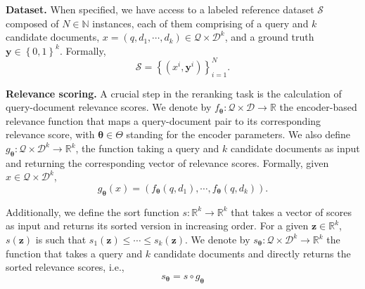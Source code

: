 \noindent \textbf{Dataset.} When specified, we have access to a labeled reference dataset $\mathcal{S}$ composed of $N \in \mathbb{N}$ instances, each of them comprising of a query and $k$ candidate documents, $x = \left( q, d_1, \cdots, d_k \right) \in  \mathcal{Q} \times \mathcal{D}^k$, and a ground truth $\mathbf{y} \in \left\{0,1\right\}^k$. Formally, 
\begin{equation}\label{eq:dataset}
\mathcal{S} = \left \{ \left( x^i, \mathbf{y}^i \right) \right \}_{i=1}^N.
\end{equation}

\noindent \textbf{Relevance scoring.} A crucial step in the reranking task is the calculation of query-document relevance scores. We denote by $f_{\bm{\theta}} : \mathcal{Q} \times \mathcal{D} \rightarrow \mathbb{R}$ the encoder-based relevance function that maps a query-document pair to its corresponding relevance score, with $\bm{\theta} \in \Theta$ standing for the encoder parameters. We also define $g_{\bm{\theta}} : \mathcal{Q} \times \mathcal{D}^k \rightarrow \mathbb{R}^k$, the function taking a query and $k$ candidate documents as input and returning the corresponding vector of relevance scores. Formally, given $x \in  \mathcal{Q} \times \mathcal{D}^k$, 
%
\begin{equation}\label{eq:rel_scores}
g_{\bm{\theta}} \left( x \right) = \left( f_{\bm{\theta}}\left(q, d_1\right), \cdots, f_{\bm{\theta}}\left(q, d_k\right) \right).
\end{equation}

\noindent Additionally, we define the sort function $s: \mathbb{R}^k \rightarrow \mathbb{R}^k$ that takes a vector of scores as input and returns its sorted version in increasing order. For a given $\mathbf{z} \in \mathbb{R}^k$, $s(\mathbf{z})$ is such that $s_1(\mathbf{z}) \leq \cdots \leq s_k(\mathbf{z})$. We denote by $s_{\bm{\theta}}: \mathcal{Q} \times \mathcal{D}^k \rightarrow \mathbb{R}^k$ the function that takes a query and $k$ candidate documents and directly returns the sorted relevance scores, i.e., 
\begin{equation}\label{eq:s_theta}
s_{\bm{\theta}} = s \circ g_{\bm{\theta}}
\end{equation}

